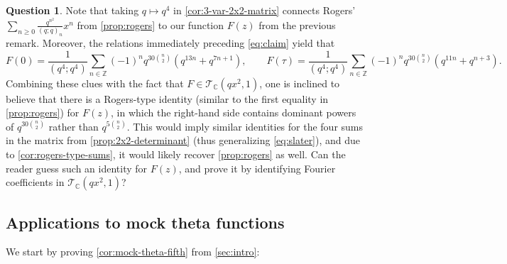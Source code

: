 \documentclass[reqno,11pt]{amsart}
\theoremstyle{definition}
\newtheorem{question}{Question}
\theoremstyle{remark}
\numberwithin{equation}{section}
\newcommand{\Z}{\mathbb{Z}}
\newcommand{\C}{\mathbb{C}}
\newcommand{\mT}{\mathcal{T}}
\begin{document}
\begin{question} \label{qtn:rogers-type-sums}
Note that taking $q \mapsto q^4$ in \cref{cor:3-var-2x2-matrix} connects Rogers' $\sum_{n \ge 0} \frac{q^{n^2}}{(q; q)_n} x^n$ from \cref{prop:rogers} to our function $F(z)$ from the previous remark. Moreover, the relations immediately preceding \cref{eq:claim} yield that %
\[
    F(0) = \frac{1}{\left(q^4; q^4\right)} \sum_{n \in \Z}
    (-1)^n q^{30\binom{n}{2}}\left(q^{13n} + q^{7n+1}\right), 
    \qquad
    F(\tau) =
    \frac{1}{\left(q^4; q^4\right)}\sum_{n \in \Z}
    (-1)^n q^{30\binom{n}{2}}\left(q^{11n} + q^{n+3}\right).
\]
Combining these clues with the fact that $F \in \mT_\C\left(qx^2, 1\right)$, one is inclined to believe that there is a Rogers-type identity (similar to the first equality in \cref{prop:rogers}) for $F(z)$, in which the right-hand side contains dominant powers of $q^{30\binom{n}{2}}$ rather than $q^{5\binom{n}{2}}$. This would imply similar identities for the four sums in the matrix from \cref{prop:2x2-determinant} (thus generalizing \cref{eq:slater}), and due to \cref{cor:rogers-type-sums}, it would likely recover \cref{prop:rogers} as well. Can the reader guess such an identity for $F(z)$, and prove it by identifying Fourier coefficients in $\mT_\C\left(qx^2, 1\right)$? 

\end{question}


\subsection{Applications to mock theta functions} \label{subsec:mock-theta}
We start by proving \cref{cor:mock-theta-fifth} from \cref{sec:intro}:
\end{document}
